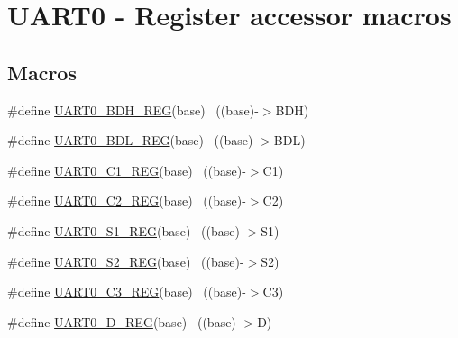 \hypertarget{group___u_a_r_t0___register___accessor___macros}{}\section{U\+A\+R\+T0 -\/ Register accessor macros}
\label{group___u_a_r_t0___register___accessor___macros}
\subsection*{Macros}
\begin{DoxyCompactItemize}
\item 
\#define \hyperlink{group___u_a_r_t0___register___accessor___macros_ga1786ecc749d15c69e1f6b3ebb5b07976}{U\+A\+R\+T0\+\_\+\+B\+D\+H\+\_\+\+R\+EG}(base)                                        ~((base)-\/$>$B\+DH)
\item 
\#define \hyperlink{group___u_a_r_t0___register___accessor___macros_ga9117ec6b275fdf09acabb04ce0d0d6a0}{U\+A\+R\+T0\+\_\+\+B\+D\+L\+\_\+\+R\+EG}(base)                                        ~((base)-\/$>$B\+DL)
\item 
\#define \hyperlink{group___u_a_r_t0___register___accessor___macros_ga923e607588dfd8dd218e437afaa00c71}{U\+A\+R\+T0\+\_\+\+C1\+\_\+\+R\+EG}(base)                                          ~((base)-\/$>$C1)
\item 
\#define \hyperlink{group___u_a_r_t0___register___accessor___macros_gafb7e1fb088da5fb6b39ef150333580c7}{U\+A\+R\+T0\+\_\+\+C2\+\_\+\+R\+EG}(base)                                          ~((base)-\/$>$C2)
\item 
\#define \hyperlink{group___u_a_r_t0___register___accessor___macros_ga9eadfd0c0a45ee8aa7ac442645b631e5}{U\+A\+R\+T0\+\_\+\+S1\+\_\+\+R\+EG}(base)                                          ~((base)-\/$>$S1)
\item 
\#define \hyperlink{group___u_a_r_t0___register___accessor___macros_gab3a5594a193c466180bf31f5539bd61e}{U\+A\+R\+T0\+\_\+\+S2\+\_\+\+R\+EG}(base)                                          ~((base)-\/$>$S2)
\item 
\#define \hyperlink{group___u_a_r_t0___register___accessor___macros_ga4a87ca420c6856607af4b5f50d6414a2}{U\+A\+R\+T0\+\_\+\+C3\+\_\+\+R\+EG}(base)                                          ~((base)-\/$>$C3)
\item 
\#define \hyperlink{group___u_a_r_t0___register___accessor___macros_gaf62db9b8f24ffd168223414a6d8df5be}{U\+A\+R\+T0\+\_\+\+D\+\_\+\+R\+EG}(base)                                            ~((base)-\/$>$D)

\end{DoxyCompactItemize}
